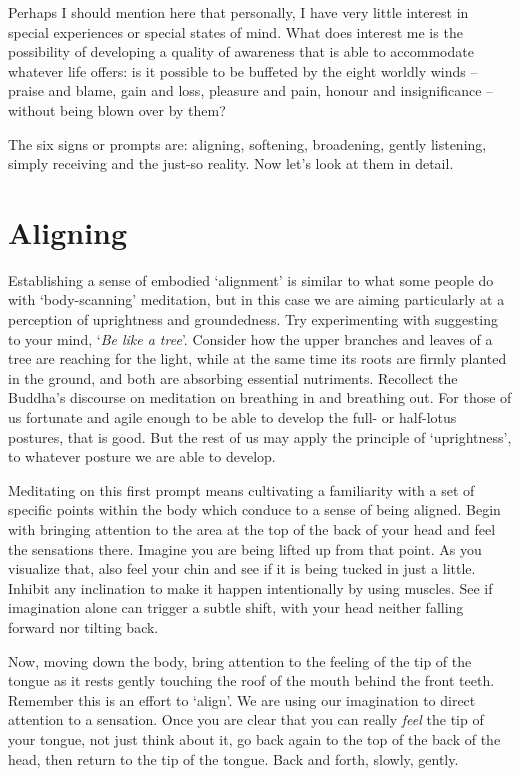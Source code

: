Perhaps I should mention here that personally, I have very little
interest in special experiences or special states of mind. What does
interest me is the possibility of developing a quality of awareness that
is able to accommodate whatever life offers: is it possible to be
buffeted by the eight worldly winds\cite{worldly-winds} -- praise and blame, gain and loss,
pleasure and pain, honour and insignificance -- without being blown over
by them?

The six signs or prompts are: aligning, softening, broadening, gently
listening, simply receiving and the just-so reality. Now let's look at
them in detail.

\section{Aligning}

Establishing a sense of embodied `alignment' is similar to what some
people do with `body-scanning' meditation, but in this case we are
aiming particularly at a perception of uprightness and groundedness. Try
experimenting with suggesting to your mind, `\emph{Be like a tree}'.
Consider how the upper branches and leaves of a tree are reaching for
the light, while at the same time its roots are firmly planted in the
ground, and both are absorbing essential nutriments. Recollect
the Buddha's discourse\cite{mn-118} on meditation on breathing in and
breathing out.
For those of us fortunate and agile enough to be able to develop the full-
or half-lotus postures, that is good. But the rest of us may apply the
principle of `uprightness', to whatever posture we are able to develop.

Meditating on this first prompt means cultivating a familiarity with a
set of specific points within the body which conduce to a sense of being
aligned. Begin with bringing attention to the area at the top of the
back of your head and feel the sensations there. Imagine you are being
lifted up from that point. As you visualize that, also feel your chin
and see if it is being tucked in just a little. Inhibit any inclination
to make it happen intentionally by using muscles. See if imagination
alone can trigger a subtle shift, with your head neither falling forward
nor tilting back.

Now, moving down the body, bring attention to the feeling of the tip of
the tongue as it rests gently touching the roof of the mouth behind the
front teeth. Remember this is an effort to `align'. We are using our
imagination to direct attention to a sensation. Once you are clear that
you can really \emph{feel} the tip of your tongue, not just think about
it, go back again to the top of the back of the head, then return to the
tip of the tongue. Back and forth, slowly, gently.

